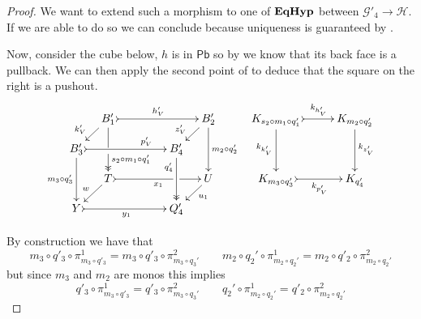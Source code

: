 \documentclass[a4paper,UKenglish,cleveref,pdftex,thm-restate,numberwithinsect]{lipics-v2021}
\newcommand{\pbc}{\mathsf{Pb}}
\newcommand{\catname}[1]{\textbf{\textup{#1}}}
\newcommand{\EqHyp}{\catname{EqHyp}} %
\begin{document}
\begin{proof}
We want to extend such a morphism to one of $\EqHyp$ between $\mathcal{G}'_4\to \mathcal{H}$. If we are able to do so we can conclude because uniqueness is guaranteed by . 

Now, consider the cube below, $h$ is in $\pbc$ so by  we know that its back face is a pullback. We can then apply the second point of  to deduce that the square on the right is a pushout.
\[\xymatrix@C=10pt@R=10pt{
	&B_1'\ar@{>>}[dd]|(.53)\hole^(.67){s_2\circ m_1\circ q_1'}\ar@{>->}[rrrr]^{h_V'} \ar[dl]_(.6){k_V'} &&&& B_2' \ar@{>}[dd]^{m_2\circ q_2'} \ar[dl]_(.6){z_V'} & & K_{s_2\circ m_1\circ q'_1}  \ar@{>->}[rr]^-{k_{h'_V}} \ar[dd]_{k_{k'_V}}&& K_{m_2\circ q'_2} \ar[dd]^{k_{z'_V}}\\
	B_3'  \ar[dd]_{m_3\circ q_3'}\ar@{>->}[rrrr]^(.7){p_V'} & & &&B_4' \ar@{>>}[dd]_(.3){q_4'} \\
	&T\ar@{>->}[rrrr]|(.68)\hole_{x_1} \ar[dl]_{w} &&&& U\ar[dl]^(.4){u_1} && K_{m_3\circ q'_3} \ar@{>->}[rr]_-{k_{p'_V}} && K_{q'_4} \\
	Y \ar@{>->}[rrrr]_{y_1} & & && Q'_4}\]

By construction we have that 
\[m_3\circ q'_3 \circ \pi_{m_3 \circ q'_3}^1 = m_3\circ q'_3 \circ \pi_{m_3\circ q_3'}^2 \qquad  m_2\circ q_2' \circ \pi_{m_2 \circ q_2'}^1 = m_2\circ q'_2 \circ \pi_{m_2 \circ q_2'}^2 \]
but since $m_3$ and $m_2$ are monos this implies
\[q'_3 \circ \pi_{m_3 \circ q'_3}^1 = q'_3 \circ \pi_{m_3\circ q_3'}^2 \qquad q_2' \circ \pi_{m_2 \circ q_2'}^1 = q'_2 \circ \pi_{m_2 \circ q_2'}^2\]
	

\end{proof}
\end{document}
